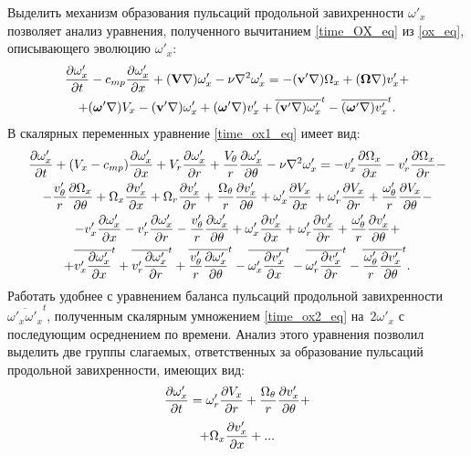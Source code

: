 Выделить механизм образования пульсаций продольной завихренности $\omega'_x$ позволяет анализ уравнения, полученного вычитанием \eqref{time_OX_eq} из \eqref{ox_eq}, описывающего эволюцию $\omega'_x$:
\begin{multline}\label{time_ox1_eq}
\frac{\partial \omega'_x}{\partial t} - c_{mp}\frac{\partial \omega'_x}{\partial x} + (\mathbf{V}\nabla) \omega'_x - \nu \nabla^2 \omega'_x = - (\mathbf{v}'\nabla) \Omega_x +(\mbox{\boldmath$\Omega$}\nabla) v'_x + \\ + (\mbox{\boldmath$\omega$}'\nabla) V_x - (\mathbf{v}'\nabla) \omega'_x  + (\mbox{\boldmath$\omega$}'\nabla) v'_x  + \overline{(\mathbf{v}'\nabla) \omega'_x}^t  - \overline{(\mbox{\boldmath$\omega$}'\nabla)v'_x}^t.
\end{multline}
В скалярных переменных уравнение \eqref{time_ox1_eq} имеет вид:
\begin{multline}\label{time_ox2_eq}
\frac{\partial \omega'_x}{\partial t} + (V_x - c_{mp})\frac{\partial \omega'_x}{\partial x} + V_r \frac{\partial \omega_x'}{\partial r} + \frac{V_\theta}{r} \frac{\partial \omega'_x}{\partial \theta} 
- \nu\nabla^2\omega'_x = - v'_x \frac{\partial \Omega_x}{\partial x} - v'_r \frac{\partial \Omega_x}{\partial r} - \\ - \frac{v'_\theta}{r} \frac{\partial \Omega_x}{\partial \theta} 
+ \Omega_x \frac{\partial v'_x}{\partial x} + \Omega_r \frac{\partial v'_x}{\partial r} + \frac{\Omega_\theta}{r} \frac{\partial v'_x}{\partial \theta}
+ \omega'_x \frac{\partial V_x}{\partial x} + \omega'_r \frac{\partial V_x}{\partial r} + \frac{\omega'_\theta}{r} \frac{\partial V_x}{\partial \theta} - \\ 
- v'_x \frac{\partial \omega'_x}{\partial x} - v'_r \frac{\partial \omega'_x}{\partial r} - \frac{v'_\theta}{r} \frac{\partial \omega'_x}{\partial \theta} 
+ \omega'_x \frac{\partial v'_x}{\partial x} + \omega'_r \frac{\partial v'_x}{\partial r} + \frac{\omega'_\theta}{r} \frac{\partial v'_x}{\partial \theta} + \\
+ \overline{v'_x \frac{\partial \omega'_x}{\partial x}}^t + \overline{v'_r \frac{\partial \omega'_x}{\partial r}}^t + \overline{\frac{v'_\theta}{r} \frac{\partial \omega'_x}{\partial \theta}}^t
- \overline{\omega'_x \frac{\partial v'_x}{\partial x}}^t - \overline{\omega'_r \frac{\partial v'_x}{\partial r}}^t - \overline{\frac{\omega'_\theta}{r} \frac{\partial v'_x}{\partial \theta}}^t.
\end{multline}
Работать удобнее с уравнением баланса пульсаций продольной завихренности $\overline{\omega'_x \omega'_x}^t$, полученным скалярным умножением \eqref{time_ox2_eq} на~$2 \omega'_x$ с последующим осреднением по времени. Анализ этого уравнения позволил выделить две группы слагаемых, ответственных за образование пульсаций продольной завихренности, имеющих вид:
\begin{equation}\label{time_ox1gen_terms1}
\frac{\partial \omega'_x}{\partial t} = \omega'_r \frac {\partial V_x}{\partial r} + \frac{\Omega_\theta}{r} \frac{\partial v'_x}{\partial \theta} + 
\end{equation}
\begin{equation}\label{time_ox1gen_term2}
+\Omega_x \frac {\partial v'_x}{\partial x} + ...
\end{equation}

